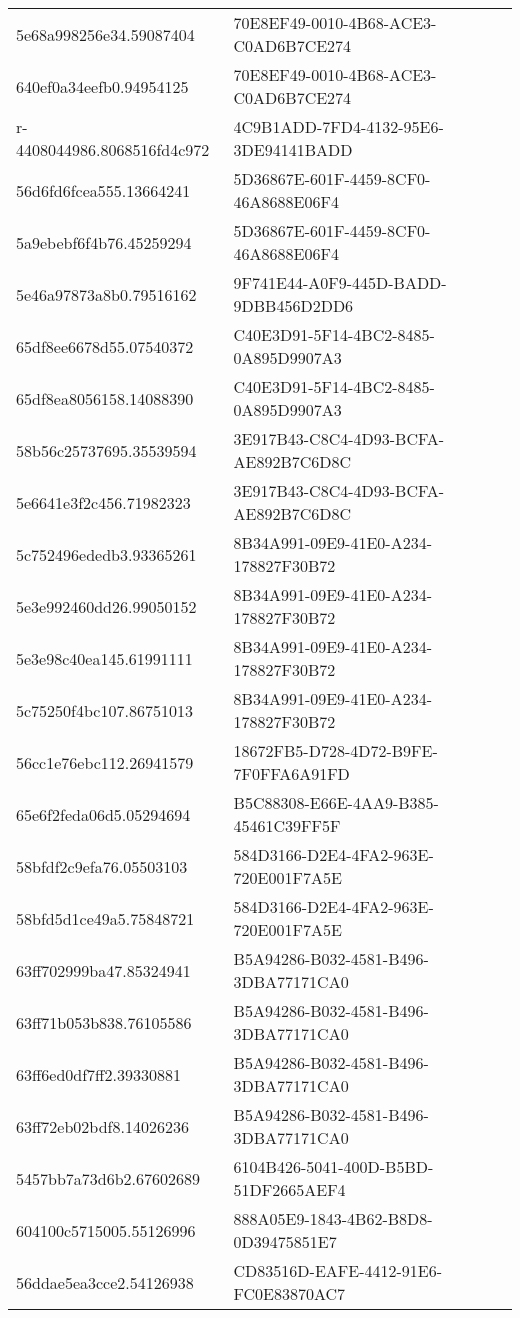 \begin{tabular}{ll}
5e68a998256e34.59087404 & 70E8EF49-0010-4B68-ACE3-C0AD6B7CE274 \\
640ef0a34eefb0.94954125 & 70E8EF49-0010-4B68-ACE3-C0AD6B7CE274 \\
r-4408044986.8068516fd4c972 & 4C9B1ADD-7FD4-4132-95E6-3DE94141BADD \\
56d6fd6fcea555.13664241 & 5D36867E-601F-4459-8CF0-46A8688E06F4 \\
5a9ebebf6f4b76.45259294 & 5D36867E-601F-4459-8CF0-46A8688E06F4 \\
5e46a97873a8b0.79516162 & 9F741E44-A0F9-445D-BADD-9DBB456D2DD6 \\
65df8ee6678d55.07540372 & C40E3D91-5F14-4BC2-8485-0A895D9907A3 \\
65df8ea8056158.14088390 & C40E3D91-5F14-4BC2-8485-0A895D9907A3 \\
58b56c25737695.35539594 & 3E917B43-C8C4-4D93-BCFA-AE892B7C6D8C \\
5e6641e3f2c456.71982323 & 3E917B43-C8C4-4D93-BCFA-AE892B7C6D8C \\
5c752496ededb3.93365261 & 8B34A991-09E9-41E0-A234-178827F30B72 \\
5e3e992460dd26.99050152 & 8B34A991-09E9-41E0-A234-178827F30B72 \\
5e3e98c40ea145.61991111 & 8B34A991-09E9-41E0-A234-178827F30B72 \\
5c75250f4bc107.86751013 & 8B34A991-09E9-41E0-A234-178827F30B72 \\
56cc1e76ebc112.26941579 & 18672FB5-D728-4D72-B9FE-7F0FFA6A91FD \\
65e6f2feda06d5.05294694 & B5C88308-E66E-4AA9-B385-45461C39FF5F \\
58bfdf2c9efa76.05503103 & 584D3166-D2E4-4FA2-963E-720E001F7A5E \\
58bfd5d1ce49a5.75848721 & 584D3166-D2E4-4FA2-963E-720E001F7A5E \\
63ff702999ba47.85324941 & B5A94286-B032-4581-B496-3DBA77171CA0 \\
63ff71b053b838.76105586 & B5A94286-B032-4581-B496-3DBA77171CA0 \\
63ff6ed0df7ff2.39330881 & B5A94286-B032-4581-B496-3DBA77171CA0 \\
63ff72eb02bdf8.14026236 & B5A94286-B032-4581-B496-3DBA77171CA0 \\
5457bb7a73d6b2.67602689 & 6104B426-5041-400D-B5BD-51DF2665AEF4 \\
604100c5715005.55126996 & 888A05E9-1843-4B62-B8D8-0D39475851E7 \\
56ddae5ea3cce2.54126938 & CD83516D-EAFE-4412-91E6-FC0E83870AC7 \\

\end{tabular}
